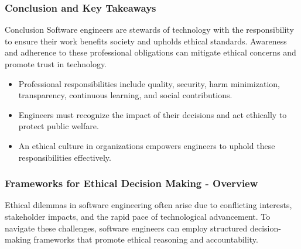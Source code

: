 \documentclass{beamer}
\begin{document}
\begin{frame}[fragile]
    \frametitle{Conclusion and Key Takeaways}
    \begin{block}{Conclusion}
        Software engineers are stewards of technology with the responsibility to ensure their work benefits society and upholds ethical standards. Awareness and adherence to these professional obligations can mitigate ethical concerns and promote trust in technology.
    \end{block}

    \begin{itemize}
        \item Professional responsibilities include quality, security, harm minimization, transparency, continuous learning, and social contributions.
        \item Engineers must recognize the impact of their decisions and act ethically to protect public welfare.
        \item An ethical culture in organizations empowers engineers to uphold these responsibilities effectively.
    \end{itemize}
\end{frame}

\begin{frame}[fragile]
    \frametitle{Frameworks for Ethical Decision Making - Overview}
    Ethical dilemmas in software engineering often arise due to conflicting interests, stakeholder impacts, and the rapid pace of technological advancement. 
    To navigate these challenges, software engineers can employ structured decision-making frameworks that promote ethical reasoning and accountability.
\end{frame}
\end{document}
